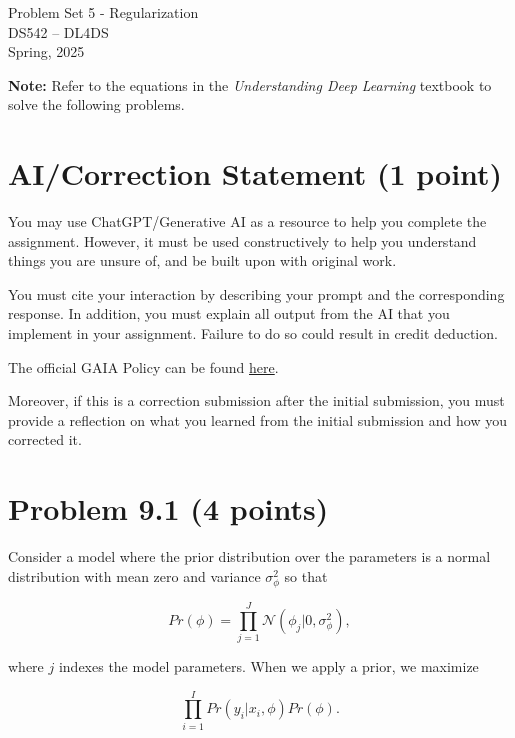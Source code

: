 \documentclass[10pt]{article}
\begin{document}
\begin{center}
    \LARGE {Problem Set 5 - Regularization} \\[1em]
    \Large{DS542 – DL4DS} \\[0.5em]
    \large Spring, 2025
\end{center}

\vspace{2em}

\noindent\textbf{Note:} Refer to the equations in the \textit{Understanding Deep Learning} 
textbook to solve the following problems.

\section*{AI/Correction Statement (1 point)}

You may use ChatGPT/Generative AI as a resource to help you complete the assignment. 
However, it must be used constructively to help you understand things you are 
unsure of, and be built upon with original work.

You must cite your interaction by describing your prompt and the corresponding response. 
In addition, you must  explain all output from the AI that you implement in your 
assignment. Failure to do so could result in credit deduction. 

The official GAIA Policy can be found 
\href{https://www.bu.edu/cds-faculty/culture-community/gaia-policy/}{here}.

Moreover, if this is a correction submission after the initial submission, 
you must provide a reflection on what you learned from the initial submission 
and how you corrected it.

\vspace{3em}

\section*{Problem 9.1 (4 points)}
Consider a model where the prior distribution over the parameters is a normal distribution with mean zero and variance
$\sigma^2_{\phi}$ so that

\begin{equation}
    Pr(\phi) = \prod_{j=1}^{J} \mathcal{N}(\phi_j | 0, \sigma^2_{\phi}),
\end{equation}

\noindent where $j$ indexes the model parameters. When we apply a prior, we maximize

\begin{equation}
    \prod_{i=1}^{I} Pr(y_i | x_i, \phi) Pr(\phi).
\end{equation}
\end{document}
